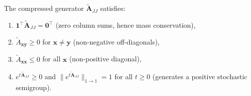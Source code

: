 \documentclass[onefignum,onetabnum]{siamart171218}
\begin{document}
\begin{proposition}
\label{prop:compressed-generator}
The compressed generator $\widetilde{\mathbf{A}}_{JJ}$ satisfies:
\begin{enumerate}
\item $\mathbf{1}^\top \widetilde{\mathbf{A}}_{JJ} = \mathbf{0}^\top$ (zero column sums, hence mass conservation),
\item $\widetilde{A}_{\boldsymbol{x}\boldsymbol{y}} \geq 0$ for $\boldsymbol{x} \neq \boldsymbol{y}$ (non-negative off-diagonals),
\item $\widetilde{A}_{\boldsymbol{x}\boldsymbol{x}} \leq 0$ for all $\boldsymbol{x}$ (non-positive diagonal),
\item $e^{t\widetilde{\mathbf{A}}_{JJ}} \geq 0$ and $\|e^{t\widetilde{\mathbf{A}}_{JJ}}\|_{1 \to 1} = 1$ for all $t \geq 0$ (generates a positive stochastic semigroup).
\end{enumerate}
\end{proposition}
\end{document}
